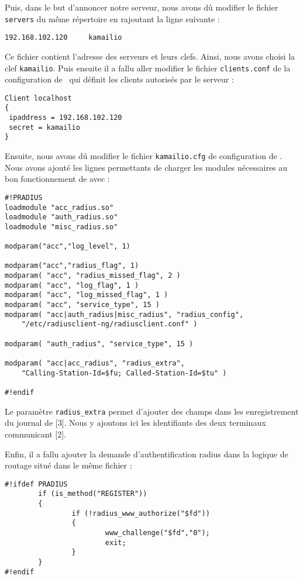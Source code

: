 Puis, dans le but d'annoncer notre serveur, nous avons dû modifier le fichier \texttt{servers} du même répertoire en rajoutant la ligne suivante :

\begin{verbatim}
192.168.102.120		kamailio
\end{verbatim}

Ce fichier contient l'adresse des serveurs {\rad} et leurs clefs. Ainsi, nous avons choisi la clef \texttt{kamailio}.
Puis ensuite il a fallu aller modifier le fichier \texttt{clients.conf} de la configuration de \frad~qui définit les clients autorisés par le serveur {\frad} :

\begin{verbatim}
Client localhost
{
 ipaddress = 192.168.102.120
 secret = kamailio
}
\end{verbatim}

Ensuite, nous avons dû modifier le fichier \texttt{kamailio.cfg} de configuration de {\kam}. Nous avons ajouté les lignes permettants de charger les modules nécessaires au bon fonctionnement de {\kam} avec {\frad} :

\begin{verbatim}
#!PRADIUS
loadmodule "acc_radius.so"
loadmodule "auth_radius.so"
loadmodule "misc_radius.so"

modparam("acc","log_level", 1)

modparam("acc","radius_flag", 1)
modparam( "acc", "radius_missed_flag", 2 )
modparam( "acc", "log_flag", 1 )
modparam( "acc", "log_missed_flag", 1 )
modparam( "acc", "service_type", 15 )
modparam( "acc|auth_radius|misc_radius", "radius_config",
	"/etc/radiusclient-ng/radiusclient.conf" )

modparam( "auth_radius", "service_type", 15 )

modparam( "acc|acc_radius", "radius_extra",
	"Calling-Station-Id=$fu; Called-Station-Id=$tu" )

#!endif
\end{verbatim}

\label{extension}
Le paramètre \texttt{radius\_extra} permet d’ajouter des champs dans les enregistrement du journal de {\frad} [3]. Nous y ajoutons ici les identifiants des deux terminaux communicant [2].

Enfin, il a fallu ajouter la demande d'authentification radius dans la logique de routage situé dans le même fichier :

\begin{verbatim}
#!ifdef PRADIUS
        if (is_method("REGISTER"))
        {
                if (!radius_www_authorize("$fd"))
                {
                        www_challenge("$fd","0");
                        exit;
                }
        }
#!endif
\end{verbatim}



